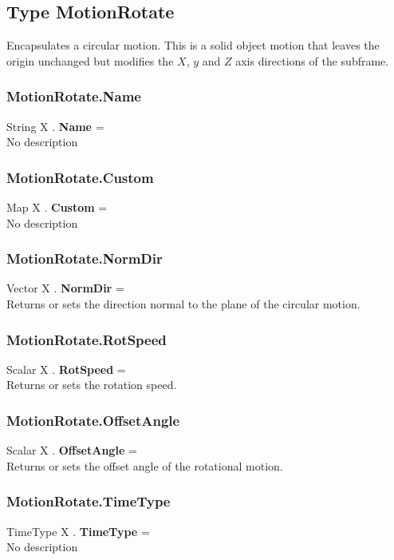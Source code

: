 \documentclass[10pt]{book}
\begin{document}
\subsection{Type MotionRotate \label{T:MotionRotate}}
Encapsulates a circular motion. This is a solid object motion that leaves the origin unchanged but modifies the $X$, $y$ and $Z$ axis directions of the subframe.

\subsubsection{MotionRotate.Name \label{F:MotionRotate:Name}}
String X . \textbf{Name} = \\
No description

\subsubsection{MotionRotate.Custom \label{F:MotionRotate:Custom}}
Map X . \textbf{Custom} = \\
No description

\subsubsection{MotionRotate.NormDir \label{F:MotionRotate:NormDir}}
Vector X . \textbf{NormDir} = \\
Returns or sets the direction normal to the plane of the circular motion.

\subsubsection{MotionRotate.RotSpeed \label{F:MotionRotate:RotSpeed}}
Scalar X . \textbf{RotSpeed} = \\
Returns or sets the rotation speed.

\subsubsection{MotionRotate.OffsetAngle \label{F:MotionRotate:OffsetAngle}}
Scalar X . \textbf{OffsetAngle} = \\
Returns or sets the offset angle of the rotational motion.

\subsubsection{MotionRotate.TimeType \label{F:MotionRotate:TimeType}}
TimeType X . \textbf{TimeType} = \\
No description
\end{document}
